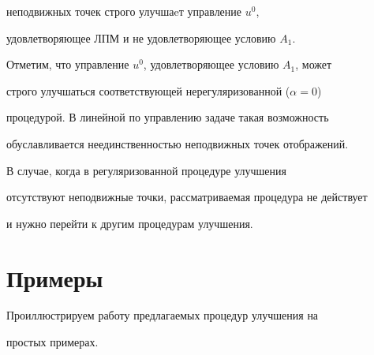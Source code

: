 неподвижных точек строго улучшаeт управление $u^0$, 


удовлетворяющее ЛПМ и не удовлетворяющее условию $A_1$. 


 


Отметим, что управление $u^0$, удовлетворяющее условию $A_1$, может 


строго улучшаться соответствующей нерегуляризованной ($\alpha=0$) 


процедурой. В линейной по управлению задаче такая возможность 


обуславливается неединственностью неподвижных точек отображений. 


 


В случае, когда в регуляризованной процедуре улучшения 


отсутствуют неподвижные точки, рассматриваемая процедура не действует 


и нужно перейти к другим процедурам улучшения. 


 


\section{Примеры} 


 


Проиллюстрируем работу предлагаемых процедур улучшения на 


простых примерах. 


 


